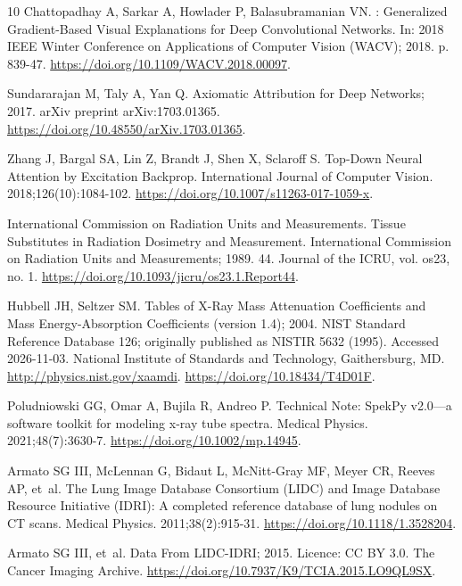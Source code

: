 \begin{thebibliography}{10}
Chattopadhay A, Sarkar A, Howlader P, Balasubramanian VN.
: Generalized Gradient-Based Visual Explanations for Deep
  Convolutional Networks.
\newblock In: 2018 IEEE Winter Conference on Applications of Computer Vision
  (WACV); 2018. p. 839-47.
\newblock \url{https://doi.org/10.1109/WACV.2018.00097}.

Sundararajan M, Taly A, Yan Q. Axiomatic Attribution for Deep Networks; 2017.
\newblock arXiv preprint arXiv:1703.01365.
\newblock \url{https://doi.org/10.48550/arXiv.1703.01365}.

Zhang J, Bargal SA, Lin Z, Brandt J, Shen X, Sclaroff S.
\newblock Top-Down Neural Attention by Excitation Backprop.
\newblock International Journal of Computer Vision. 2018;126(10):1084-102.
\newblock \url{https://doi.org/10.1007/s11263-017-1059-x}.

{International Commission on Radiation Units and Measurements}.
\newblock Tissue Substitutes in Radiation Dosimetry and Measurement.
\newblock International Commission on Radiation Units and Measurements; 1989.
  44.
\newblock Journal of the ICRU, vol. os23, no. 1.
\newblock \url{https://doi.org/10.1093/jicru/os23.1.Report44}.

Hubbell JH, Seltzer SM. Tables of {X}-Ray Mass Attenuation Coefficients and
  Mass Energy-Absorption Coefficients (version 1.4); 2004.
\newblock NIST Standard Reference Database 126; originally published as NISTIR
  5632 (1995). Accessed 2026-11-03.
\newblock National Institute of Standards and Technology, Gaithersburg, MD.
  \url{http://physics.nist.gov/xaamdi}.
\newblock \url{https://doi.org/10.18434/T4D01F}.

Poludniowski GG, Omar A, Bujila R, Andreo P.
\newblock Technical Note: {SpekPy} v2.0---a software toolkit for modeling x-ray
  tube spectra.
\newblock Medical Physics. 2021;48(7):3630-7.
\newblock \url{https://doi.org/10.1002/mp.14945}.

Armato SG III, McLennan G, Bidaut L, McNitt-Gray MF, Meyer CR, Reeves AP,
  et~al.
\newblock The {Lung Image Database Consortium (LIDC)} and {Image Database
  Resource Initiative (IDRI)}: A completed reference database of lung nodules
  on {CT} scans.
\newblock Medical Physics. 2011;38(2):915-31.
\newblock \url{https://doi.org/10.1118/1.3528204}.

Armato SG III, et~al. Data From {LIDC-IDRI}; 2015.
\newblock Licence: CC BY 3.0.
\newblock The Cancer Imaging Archive.
\newblock \url{https://doi.org/10.7937/K9/TCIA.2015.LO9QL9SX}.


\end{thebibliography}
